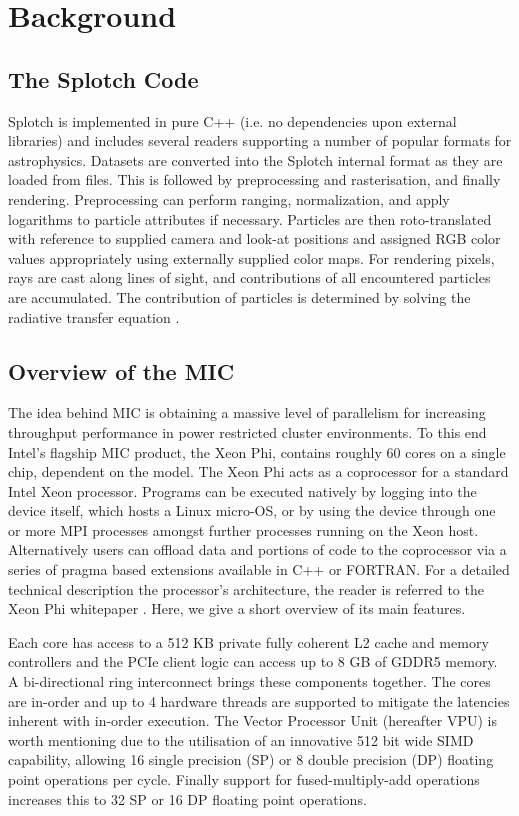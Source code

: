 \documentclass[runningheads,a4paper]{llncs}
\begin{document}
\section{Background}
\label{sect:background}

\subsection{The Splotch Code}
\label{sect:splotchcode}

Splotch \cite{splotch} is implemented in pure C++ (i.e. no dependencies upon external libraries) and includes several readers 
supporting a number of popular formats for astrophysics. Datasets are converted into the Splotch internal format as they are 
loaded from files. This is followed by preprocessing and rasterisation, and finally rendering. 
Preprocessing can perform ranging, normalization, 
and apply logarithms to particle attributes if necessary. Particles are then roto-translated with reference to supplied 
camera and look-at positions and assigned RGB color values appropriately using externally supplied color maps. For rendering 
pixels, rays are cast along lines of sight, and contributions of all encountered particles are accumulated. The contribution 
of particles is determined by solving the radiative transfer equation \cite{splotchgpu}.

\subsection{Overview of the MIC}
\label{sect:micoverview}

The idea behind MIC is obtaining a massive level of parallelism for increasing throughput performance in power restricted cluster 
environments. To this end Intel's flagship MIC product, the Xeon Phi, contains roughly 60 cores on a single chip, dependent on the 
model. The Xeon Phi acts as a coprocessor for a standard Intel Xeon processor. Programs can be executed natively by logging into 
the device itself, which hosts a Linux micro-OS, or by using the device through one or more MPI processes amongst further processes 
running on the Xeon host. Alternatively users can offload data and portions of code to the coprocessor via a series of pragma 
based extensions available in C++ or FORTRAN.
For a detailed technical description the processor's architecture, the reader is referred to the
Xeon Phi whitepaper \cite{xeonphi}. Here, we give a short overview of its main features.

Each core has access to a 512 KB private fully coherent L2 cache and memory controllers
and the PCIe client logic can access up to 8 GB of GDDR5 memory. A bi-directional ring interconnect
brings these components together. The cores are in-order and up to 4 hardware threads are supported to mitigate
the latencies inherent with in-order execution. The Vector Processor Unit (hereafter VPU) is worth mentioning due to
the utilisation of an innovative 512 bit wide SIMD capability, allowing 16 single precision (SP) or 8 double precision
(DP) floating point operations per cycle. Finally support for fused-multiply-add operations increases this to 32 SP or 16 DP
floating point operations.
\end{document}
